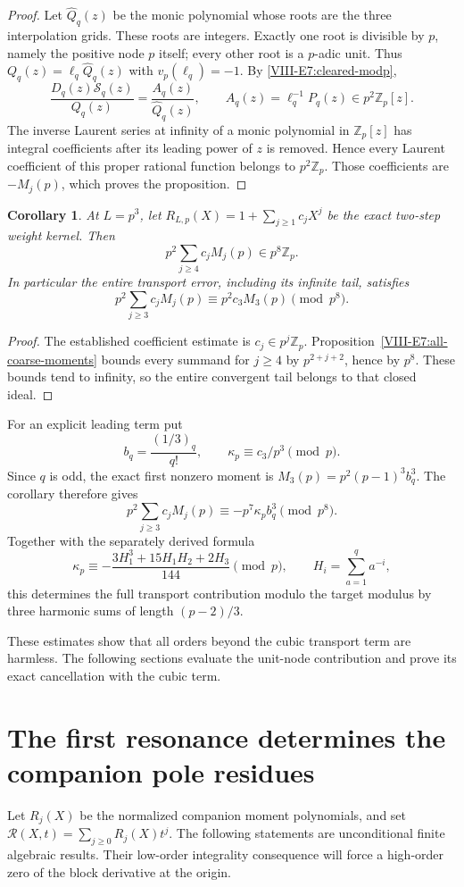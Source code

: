 \documentclass[11pt,letterpaper]{article}
\newtheorem{corollary}[theorem]{Corollary}
\numberwithin{equation}{section}
\begin{document}
\begin{proof}
Let $\widehat Q_q(z)$ be the monic polynomial whose roots are the
three interpolation grids. These roots are integers. Exactly one
root is divisible by $p$, namely the positive node $p$ itself;
every other root is a $p$-adic unit. Thus
$Q_q(z)=\ell_q\widehat Q_q(z)$ with $v_p(\ell_q)=-1$.
By \eqref{VIII-E7:cleared-modp},
\[
 \frac{D_q(z)\mathcal S_q(z)}{Q_q(z)}
 =\frac{A_q(z)}{\widehat Q_q(z)},\qquad
 A_q(z)=\ell_q^{-1}P_q(z)\in p^2\mathbb Z_p[z].
\]
The inverse Laurent series at infinity of a monic polynomial in
$\mathbb Z_p[z]$ has integral coefficients after its leading power
of $z$ is removed. Hence every Laurent coefficient of this proper
rational function belongs to $p^2\mathbb Z_p$.
Those coefficients are $-M_j(p)$, which proves the proposition.
\end{proof}

\begin{corollary}\label{VIII-E7:r3tail}
At $L=p^3$, let $R_{L,p}(X)=1+\sum_{j\ge1}c_jX^j$ be the exact
two-step weight kernel. Then
\[
 p^2\sum_{j\ge4}c_jM_j(p)\in p^8\mathbb Z_p.
\]
In particular the entire transport error, including its infinite
tail, satisfies
\[
 p^2\sum_{j\ge3}c_jM_j(p)
 \equiv p^2c_3M_3(p)\pmod{p^8}.
\]
\end{corollary}
\begin{proof}
The established coefficient estimate is $c_j\in p^j\mathbb Z_p$.
Proposition~\ref{VIII-E7:all-coarse-moments} bounds every summand for
$j\ge4$ by $p^{2+j+2}$, hence by $p^8$. These bounds tend to
infinity, so the entire convergent tail belongs to that closed ideal.
\end{proof}

For an explicit leading term put
\[
 b_q=\frac{(1/3)_q}{q!},\qquad
 \kappa_p\equiv c_3/p^3\pmod p.
\]
Since $q$ is odd, the exact first nonzero moment is
$M_3(p)=p^2(p-1)^3b_q^3$. The corollary therefore gives
\[
 \boxed{\quad
 p^2\sum_{j\ge3}c_jM_j(p)
 \equiv-p^7\kappa_pb_q^3\pmod{p^8}.
 \quad}
\]
Together with the separately derived formula
\[
 \kappa_p\equiv-
 \frac{3H_1^3+15H_1H_2+2H_3}{144}\pmod p,
 \qquad H_i=\sum_{a=1}^{q}a^{-i},
\]
this determines the full transport contribution modulo the target
modulus by three harmonic sums of length $(p-2)/3$.

These estimates show that all orders beyond the cubic transport term
are harmless. The following sections evaluate the unit-node contribution
and prove its exact cancellation with the cubic term.



\section{The first resonance determines the companion pole residues}\label{loc-VIII-18}
\label{VIII-sec:e-first-resonance}
Let $R_j(X)$ be the normalized companion moment polynomials, and set
$\mathcal R(X,t)=\sum_{j\ge0}R_j(X)t^j$.
The following statements are unconditional finite algebraic results.
Their low-order integrality consequence will force a high-order
zero of the block derivative at the origin.
\end{document}
